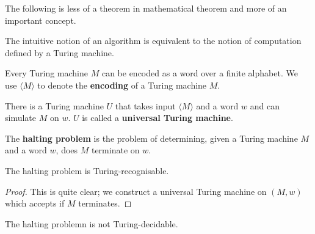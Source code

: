 
The following is less of a theorem in mathematical theorem and more of an important concept.

\begin{theorem}
    The intuitive notion of an algorithm is equivalent to the notion of computation defined by a Turing machine.
\end{theorem}

\begin{proposition}
    Every Turing machine $M$ can be encoded as a word over a finite alphabet. We use $\langle M \rangle$ to denote the \textbf{encoding} of a Turing machine $M$.
\end{proposition}

\begin{theorem}
    There is a Turing machine $U$ that takes input $\langle M \rangle$ and a word $w$ and can simulate $M$ on $w$. $U$ is called a \textbf{universal Turing machine}.
\end{theorem}

\begin{example}
    The \textbf{halting problem} is the problem of determining, given a Turing machine $M$ and a word $w$, does $M$ terminate on $w$.
\end{example}

\begin{proposition}[]
    The halting problem is Turing-recognisable.
\end{proposition}

\begin{proof}
    This is quite clear; we construct a universal Turing machine on $(M, w)$ which accepts if $M$ terminates.
\end{proof}

\begin{proposition}[]
    The halting problemn is not Turing-decidable.
\end{proposition}

